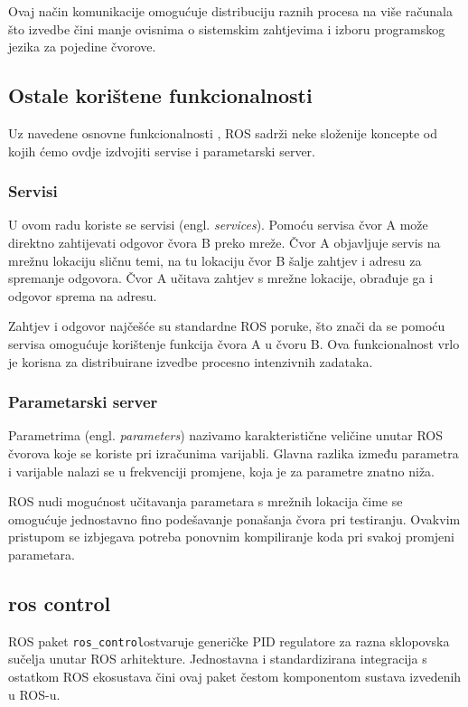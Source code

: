 \documentclass[times, utf8, diplomski, numeric]{fer}
\begin{document}
Ovaj način komunikacije omogućuje distribuciju raznih procesa na više računala što izvedbe čini manje ovisnima o sistemskim zahtjevima i izboru programskog jezika za pojedine čvorove. 

\subsection{Ostale korištene funkcionalnosti}
Uz navedene osnovne funkcionalnosti , ROS sadrži neke složenije koncepte od kojih ćemo ovdje izdvojiti servise i parametarski server. 

\subsubsection{Servisi}
U ovom radu koriste se servisi (engl. \textit{services}). 
Pomoću servisa čvor A može direktno zahtijevati odgovor čvora B preko mreže. 
Čvor A objavljuje servis na mrežnu lokaciju sličnu temi, na tu lokaciju čvor B šalje zahtjev i adresu za spremanje odgovora. 
Čvor A učitava zahtjev s mrežne lokacije, obrađuje ga i odgovor sprema na adresu.

Zahtjev i odgovor najčešće su standardne ROS poruke, što znači da se pomoću servisa omogućuje korištenje funkcija čvora A u čvoru B. 
Ova funkcionalnost vrlo je korisna za distribuirane izvedbe procesno intenzivnih zadataka. 

\subsubsection{Parametarski server}
Parametrima (engl. \textit{parameters}) nazivamo karakteristične veličine unutar ROS čvorova koje se koriste pri izračunima varijabli. 
Glavna razlika između parametra i varijable nalazi se u frekvenciji promjene, koja je za parametre znatno niža. 

ROS nudi mogućnost učitavanja parametara s mrežnih lokacija čime se omogućuje jednostavno fino podešavanje ponašanja čvora pri testiranju.
Ovakvim pristupom se izbjegava potreba ponovnim kompiliranje koda pri svakoj promjeni parametara.

\subsection{ros control}
ROS paket \texttt{ros\_control}ostvaruje generičke PID regulatore za razna sklopovska sučelja unutar ROS arhitekture.
Jednostavna i standardizirana integracija s ostatkom ROS ekosustava čini ovaj paket čestom komponentom sustava izvedenih u ROS-u.
\end{document}
